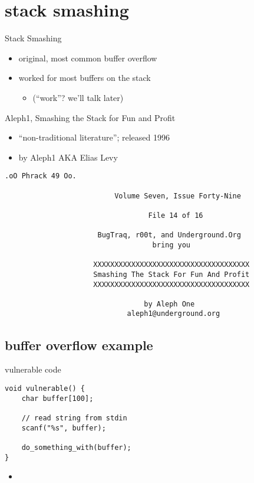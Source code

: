 \section{stack smashing}

\begin{frame}{Stack Smashing}
    \begin{itemize}
    \item original, most common buffer overflow 
    \item worked for most buffers on the stack
        \begin{itemize}
        \item (``work''? we'll talk later)
        \end{itemize}
    \end{itemize}
\end{frame}

\begin{frame}[fragile,label=smashing]{Aleph1, Smashing the Stack for Fun and Profit}
    \begin{itemize}
    \item ``non-traditional literature''; released 1996
    \item by Aleph1 AKA Elias Levy
    \end{itemize}
\begin{Verbatim}[fontsize=\scriptsize]
                               .oO Phrack 49 Oo.

                          Volume Seven, Issue Forty-Nine
                                     
                                  File 14 of 16

                      BugTraq, r00t, and Underground.Org
                                   bring you

                     XXXXXXXXXXXXXXXXXXXXXXXXXXXXXXXXXXXXX
                     Smashing The Stack For Fun And Profit
                     XXXXXXXXXXXXXXXXXXXXXXXXXXXXXXXXXXXXX

                                 by Aleph One
                             aleph1@underground.org
\end{Verbatim}
\end{frame}

\subsection{buffer overflow example}

\begin{frame}[fragile,label=vulnCAgain]{vulnerable code}
\lstset{language=C,style=small}
\begin{lstlisting}
void vulnerable() {
    char buffer[100];

    // read string from stdin
    scanf("%s", buffer);

    do_something_with(buffer);
}
\end{lstlisting}
\begin{itemize}
\item<2> 
\end{itemize}
\end{frame}



